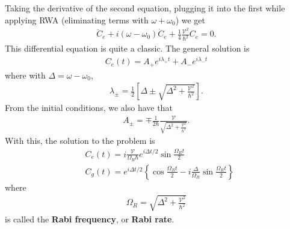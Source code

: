 \documentclass{book}
\theoremstyle{definition}
\newcommand{\f}[2]{\frac{#1}{#2}}
\newcommand{\lb}{\left[}
\newcommand{\rb}{\right]}
\newcommand{\lc}{\left\{}
\newcommand{\rc}{\right\}}
\begin{document}
Taking the derivative of the second equation, plugging it into the first while applying RWA (eliminating terms with $\omega + \omega_0$) we get
\begin{align}
\ddot{C}_e + i(\omega - \omega_0 )\dot{C}_e + \f{1}{4}\f{\mathcal{V}^2}{\hbar^2}C_e = 0.
\end{align}
This differential equation is quite a classic. The general solution is
\begin{align}
C_e(t) = A_+ e^{i\lambda_+ t} + A_- e^{i\lambda_- t} 
\end{align}
where with $\Delta = \omega - \omega_0$,
\begin{align}
\lambda_{\pm} = \f{1}{2}\lb \Delta \pm \sqrt{ \Delta^2 + \f{\mathcal{V}^2}{\hbar^2}} \rb.
\end{align}
From the initial conditions, we also have that
\begin{align}
A_{\pm} = \mp \f{1}{2\hbar}\f{\mathcal{V}}{\sqrt{\Delta^2 + \f{\mathcal{V}^2}{\hbar^2}}}.
\end{align}
With this, the solution to the problem is
\begin{align}
&C_e(t) = i\f{\mathcal{V}}{\Omega_R \hbar}e^{i\Delta t/2}\sin\f{\Omega_R t}{2}\\
&C_g(t) = e^{i\Delta t/2} \lc \cos\f{\Omega_R t}{2} - i\f{\Delta}{\Omega_R}\sin\f{\Omega_R t}{2} \rc
\end{align}
where
\begin{align}
\Omega_R = \sqrt{\Delta^2 + \f{\mathcal{V}^2}{\hbar^2}}
\end{align}
is called the \textbf{Rabi frequency}, or \textbf{Rabi rate}. \\
\end{document}
